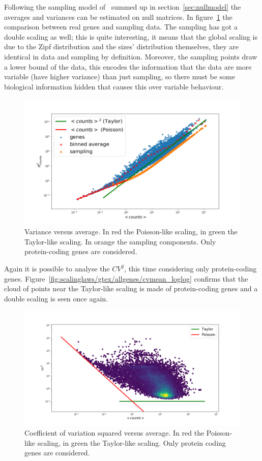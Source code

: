 Following the sampling model of~\cite{Mazzolini2018} summed up in section~\ref{sec:nullmodel} the averages and variances can be estimated on null matrices. In figure~\ref{fig:scalinglaws/gtex/varmean_3sigma} the comparison between real genes and sampling data. The sampling has got a double scaling as well; this is quite interesting, it means that the global scaling is due to the Zipf distribution and the sizes' distribution themselves, they are identical in data and sampling by definition.
Moreover, the sampling points draw a lower bound of the data, this encodes the information that the data are more variable (have higher variance) than just sampling, so there must be some biological information hidden that causes this over variable behaviour.
\begin{figure}[H]
    \centering
    \includegraphics[width=0.8\linewidth]{pictures/scalinglaws/gtex/varmean_3sigma.png}
    \caption{Variance versus average. In \textcolor{pythonred}{red} the Poisson-like scaling, in \textcolor{pythongreen}{green} the Taylor-like scaling. In \textcolor{pythonorange}{orange} the sampling components. Only protein-coding genes are considered.}
    \label{fig:scalinglaws/gtex/varmean_3sigma}
\end{figure}

Again it is possible to analyse the $CV^2$, this time considering only protein-coding genes. Figure~\ref{fig:scalinglaws/gtex/allgenes/cvmean_loglog} confirms that the cloud of points near the Taylor-like scaling is made of protein-coding genes and a double scaling is seen once again.
\begin{figure}[htb!]
    \centering
    \includegraphics[width=0.9\linewidth]{pictures/scalinglaws/gtex/cvmean_loglog_density.png}
    \caption{Coefficient of variation squared versus average. In \textcolor{pythonred}{red} the Poisson-like scaling, in \textcolor{pythongreen}{green} the Taylor-like scaling. Only protein coding genes are considered.}
    \label{fig:scalinglaws/gtex/cvmean_loglog}
\end{figure}

